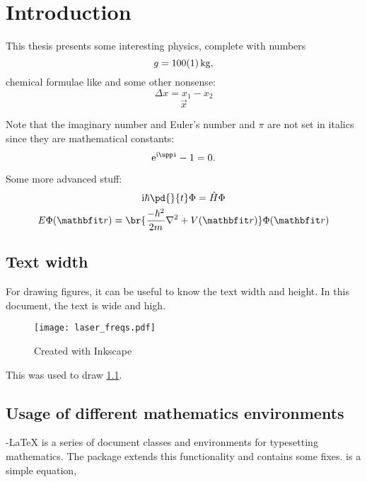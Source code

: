 \chapter{Introduction}\label{ch:introduction}
This thesis presents some interesting physics, complete with numbers
\begin{equation}
	g = \SI{100+-1}{kg}\text{,}
\end{equation}
chemical formulae like  and some other nonsense:
\begin{equation}
	\Delta x = x_1 - x_2
\end{equation}
\begin{equation}
	\vec{x}
\end{equation}

Note that the imaginary number and Euler's number and $\pi$ are not set in italics since they are mathematical constants:
\begin{equation}
	\e^{\i\pi} - 1 = 0\text{.}
\end{equation}

Some more advanced stuff:
\begin{subequations}\label{eq:schroedinger}
	\begin{gather}
		\i \hbar \pd{}{t}\Phi = \op{H}\Phi\\
		E\Phi(\vec{r}) = \br{\frac{-\hbar^2}{2m} \nabla^2 + V(\vec{r}) } \Phi(\vec{r})
	\end{gather}
\end{subequations}

\section{Text width}

For drawing figures, it can be useful to know the text width and height. In this document, the text is \the\textwidth {} wide and \the\textheight {} high.

\begin{figure}[tb]
	\centering
	\texttt{[image: laser\_freqs.pdf]}
	\caption{Created with Inkscape}
	\label{fig:laser_freqs}
\end{figure}


This was used to draw \cref{fig:laser_freqs}.




\section{Usage of different mathematics environments}
 {\AmS}-{\LaTeX} is a series of document classes and environments for typesetting mathematics. The package  extends this functionality and contains some fixes.  is a simple equation,

